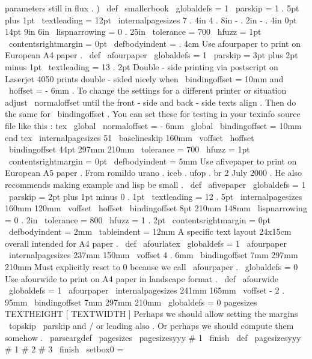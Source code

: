 {parameters
still
in
flux
.
)
\
def
\
smallerbook
{
{
\
globaldefs
=
1
\
parskip
=
1
.
5pt
plus
1pt
\
textleading
=
12pt
%
\
internalpagesizes
{
7
.
4in
}
{
4
.
8in
}
%
{
-
.
2in
}
{
-
.
4in
}
%
{
0pt
}
{
14pt
}
%
{
9in
}
{
6in
}
%
%
\
lispnarrowing
=
0
.
25in
\
tolerance
=
700
\
hfuzz
=
1pt
\
contentsrightmargin
=
0pt
\
defbodyindent
=
.
4cm
}
}
%
Use
afourpaper
to
print
on
European
A4
paper
.
\
def
\
afourpaper
{
{
\
globaldefs
=
1
\
parskip
=
3pt
plus
2pt
minus
1pt
\
textleading
=
13
.
2pt
%
%
Double
-
side
printing
via
postscript
on
Laserjet
4050
%
prints
double
-
sided
nicely
when
\
bindingoffset
=
10mm
and
\
hoffset
=
-
6mm
.
%
To
change
the
settings
for
a
different
printer
or
situation
adjust
%
\
normaloffset
until
the
front
-
side
and
back
-
side
texts
align
.
Then
%
do
the
same
for
\
bindingoffset
.
You
can
set
these
for
testing
in
%
your
texinfo
source
file
like
this
:
%
tex
%
\
global
\
normaloffset
=
-
6mm
%
\
global
\
bindingoffset
=
10mm
%
end
tex
\
internalpagesizes
{
51
\
baselineskip
}
{
160mm
}
{
\
voffset
}
{
\
hoffset
}
%
{
\
bindingoffset
}
{
44pt
}
%
{
297mm
}
{
210mm
}
%
%
\
tolerance
=
700
\
hfuzz
=
1pt
\
contentsrightmargin
=
0pt
\
defbodyindent
=
5mm
}
}
%
Use
afivepaper
to
print
on
European
A5
paper
.
%
From
romildo
urano
.
iceb
.
ufop
.
br
2
July
2000
.
%
He
also
recommends
making
example
and
lisp
be
small
.
\
def
\
afivepaper
{
{
\
globaldefs
=
1
\
parskip
=
2pt
plus
1pt
minus
0
.
1pt
\
textleading
=
12
.
5pt
%
\
internalpagesizes
{
160mm
}
{
120mm
}
%
{
\
voffset
}
{
\
hoffset
}
%
{
\
bindingoffset
}
{
8pt
}
%
{
210mm
}
{
148mm
}
%
%
\
lispnarrowing
=
0
.
2in
\
tolerance
=
800
\
hfuzz
=
1
.
2pt
\
contentsrightmargin
=
0pt
\
defbodyindent
=
2mm
\
tableindent
=
12mm
}
}
%
A
specific
text
layout
24x15cm
overall
intended
for
A4
paper
.
\
def
\
afourlatex
{
{
\
globaldefs
=
1
\
afourpaper
\
internalpagesizes
{
237mm
}
{
150mm
}
%
{
\
voffset
}
{
4
.
6mm
}
%
{
\
bindingoffset
}
{
7mm
}
%
{
297mm
}
{
210mm
}
%
%
%
Must
explicitly
reset
to
0
because
we
call
\
afourpaper
.
\
globaldefs
=
0
}
}
%
Use
afourwide
to
print
on
A4
paper
in
landscape
format
.
\
def
\
afourwide
{
{
\
globaldefs
=
1
\
afourpaper
\
internalpagesizes
{
241mm
}
{
165mm
}
%
{
\
voffset
}
{
-
2
.
95mm
}
%
{
\
bindingoffset
}
{
7mm
}
%
{
297mm
}
{
210mm
}
%
\
globaldefs
=
0
}
}
%
pagesizes
TEXTHEIGHT
[
TEXTWIDTH
]
%
Perhaps
we
should
allow
setting
the
margins
\
topskip
\
parskip
%
and
/
or
leading
also
.
Or
perhaps
we
should
compute
them
somehow
.
%
\
parseargdef
\
pagesizes
{
\
pagesizesyyy
#
1
\
finish
}
\
def
\
pagesizesyyy
#
1
#
2
#
3
\
finish
{
{
%
\
setbox0
=
\
}}}
